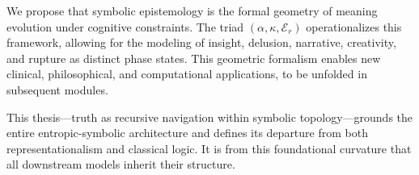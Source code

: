 We propose that symbolic epistemology is the formal geometry of meaning evolution under cognitive constraints. The triad $(\alpha, \kappa, \mathcal{E}_r)$ operationalizes this framework, allowing for the modeling of insight, delusion, narrative, creativity, and rupture as distinct phase states. This geometric formalism enables new clinical, philosophical, and computational applications, to be unfolded in subsequent modules.

This thesis—truth as recursive navigation within symbolic topology—grounds the entire entropic-symbolic architecture and defines its departure from both representationalism and classical logic. It is from this foundational curvature that all downstream models inherit their structure.
